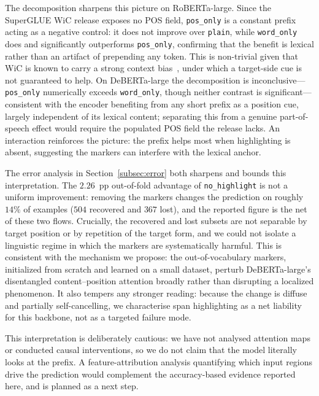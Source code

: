 \documentclass[runningheads]{llncs}
\begin{document}
The decomposition sharpens this picture on RoBERTa-large. Since the SuperGLUE
WiC release exposes no POS field, \texttt{pos\_only} is a constant prefix acting
as a negative control: it does not improve over \texttt{plain}, while
\texttt{word\_only} does and significantly outperforms \texttt{pos\_only},
confirming that the benefit is lexical rather than an artifact of prepending any
token. This is non-trivial given that WiC is known to carry a strong context
bias~\cite{liu2021context}, under which a target-side cue is not guaranteed to
help. On DeBERTa-large the decomposition is
inconclusive---\texttt{pos\_only} numerically exceeds \texttt{word\_only}, though
neither contrast is significant---consistent with the encoder benefiting from any
short prefix as a position cue, largely independent of its lexical content;
separating this from a genuine part-of-speech effect would require the populated
POS field the release lacks. An interaction reinforces the picture: the prefix
helps most when highlighting is absent, suggesting the markers can interfere with
the lexical anchor.

The error analysis in Section~\ref{subsec:error} both sharpens and bounds this
interpretation. The $2.26$~pp out-of-fold advantage of \texttt{no\_highlight} is
not a uniform improvement: removing the markers changes the prediction on
roughly $14\%$ of examples ($504$ recovered and $367$ lost), and the reported
figure is the net of these two flows. Crucially, the recovered and lost subsets
are not separable by target position or by repetition of the target form, and we
could not isolate a linguistic regime in which the markers are systematically
harmful. This is consistent with the mechanism we propose: the out-of-vocabulary
markers, initialized from scratch and learned on a small dataset, perturb
DeBERTa-large's disentangled content--position attention broadly rather than
disrupting a localized phenomenon. It also tempers
any stronger reading: because the change is diffuse and partially
self-cancelling, we characterise span highlighting as a net liability for this
backbone, not as a targeted failure mode.

This interpretation is deliberately cautious: we have not analysed attention
maps or conducted causal interventions, so we do not claim that the model
literally looks at the prefix. A feature-attribution analysis quantifying which
input regions drive the prediction would complement the accuracy-based evidence
reported here, and is planned as a next step.

\end{document}
